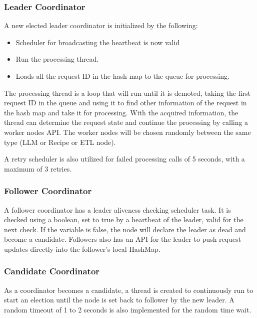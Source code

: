 \documentclass[conference]{IEEEtran}
\begin{document}
\subsubsection{Leader Coordinator}
A new elected leader coordinator is initialized by the following:
\begin{itemize}
    \item Scheduler for broadcasting the heartbeat is now valid
    \item Run the processing thread.
    \item Loads all the request ID in the hash map to the queue for processing.
\end{itemize}

The processing thread is a loop that will run until it is demoted, taking the first request ID in the queue and using it to find other information of the request in the hash map and take it for processing. With the acquired information, the thread can determine the request state and continue the processing by calling a worker nodes API. The worker nodes will be chosen randomly between the same type (LLM or Recipe or ETL node).

A retry scheduler is also utilized for failed processing calls of 5 seconds, with a maximum of 3 retries.

\subsubsection{Follower Coordinator}
A follower coordinator has a leader aliveness checking scheduler task. It is checked using a boolean, set to true by a heartbeat of the leader, valid for the next check. If the variable is false, the node will declare the leader as dead and become a candidate. 
Followers also has an API for the leader to push request updates directly into the follower’s local HashMap.

\subsubsection{Candidate Coordinator}
As a coordinator becomes a candidate, a thread is created to continuously run to start an election until the node is set back to follower by the new leader. A random timeout of 1 to 2 seconds is also implemented for the random time wait.
\end{document}

